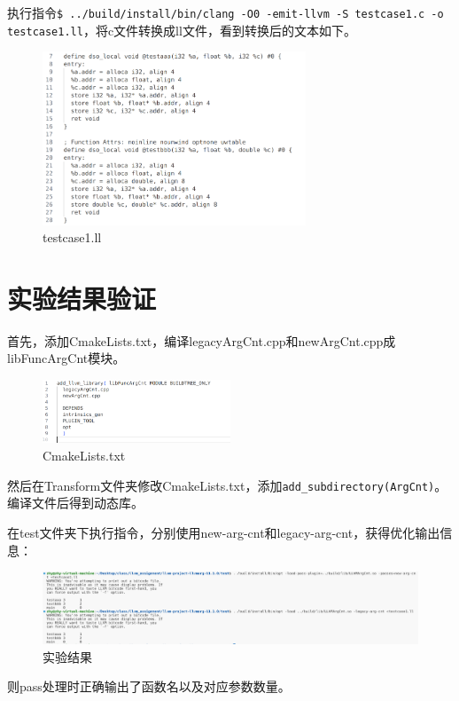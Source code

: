 \documentclass[11pt, a4paper, oneside,UTF8]{ctexart}
\begin{document}
执行指令\texttt{\$ ../build/install/bin/clang -O0 -emit-llvm -S testcase1.c -o testcase1.ll}，将c文件转换成ll文件，看到转换后的文本如下。
\begin{figure}[h]
    \centering
    \includegraphics[width=0.7\textwidth]{./figure/test_2.png}
    \caption{testcase1.ll}
    \label{figure:3.2}
\end{figure}

\section{实验结果验证}

首先，添加CmakeLists.txt，编译legacyArgCnt.cpp和newArgCnt.cpp成libFuncArgCnt模块。
\begin{figure}[h]
    \centering
    \includegraphics[width=0.5\textwidth]{./figure/cmake_1.png}
    \caption{CmakeLists.txt}
    \label{figure:4.1}
\end{figure}

然后在Transform文件夹修改CmakeLists.txt，添加\texttt{add\_subdirectory(ArgCnt)}。编译文件后得到动态库。

在test文件夹下执行指令，分别使用new-arg-cnt和legacy-arg-cnt，获得优化输出信息：

\begin{figure}[h]
    \centering
    \includegraphics[width=1\textwidth]{./figure/result.png}
    \caption{实验结果}
    \label{figure:5.1}
\end{figure}
则pass处理时正确输出了函数名以及对应参数数量。
\end{document}
